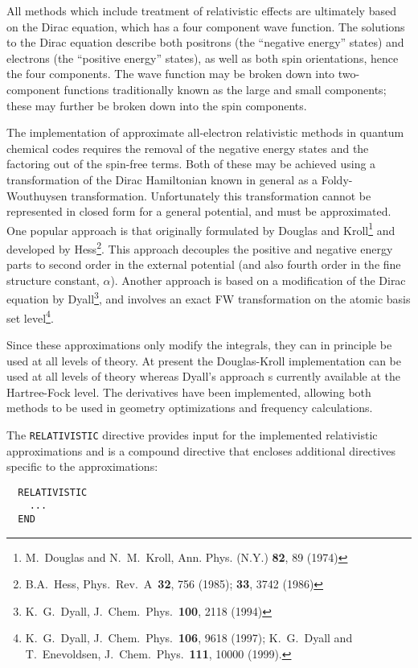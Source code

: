 \label{sec:rel}



All methods which include treatment of relativistic effects are ultimately
based on the Dirac equation, which has a four component wave function. The
solutions to the Dirac equation describe both positrons (the ``negative
energy'' states) and electrons (the ``positive energy'' states), as well as
both spin orientations, hence the four components. The wave function may be
broken down into two-component functions traditionally known as the large
and small components; these may further be broken down into the spin
components. 

The implementation of approximate all-electron relativistic methods in
quantum chemical codes requires the removal of the negative energy states
and the factoring out of the spin-free terms. Both of these may be achieved
using a transformation of the Dirac Hamiltonian known in general as a
Foldy-Wouthuysen transformation. Unfortunately this transformation cannot be
represented in closed form for a general potential, and must be
approximated.  One popular approach is that originally formulated by Douglas
and Kroll\footnote{M.~Douglas and N.~M.~Kroll, Ann. Phys. (N.Y.)  {\bf 82},
89 (1974)} and developed by Hess\footnote{B.A.~Hess, Phys.~Rev.~A~{\bf 32},
756 (1985); {\bf 33}, 3742 (1986)}. This approach decouples the positive and
negative energy parts to second order in the external potential (and also
fourth order in the fine structure constant, $\alpha$). Another approach is
based on a modification of the Dirac equation by Dyall\footnote{K.~G.~Dyall,
J.~Chem.~Phys.~{\bf 100}, 2118 (1994)}, and involves an exact FW
transformation on the atomic basis set level\footnote{K.~G.~Dyall,
J.~Chem.~Phys.~{\bf 106}, 9618 (1997); K.~G.~Dyall and T.~Enevoldsen,
J.~Chem.~Phys.~{\bf 111}, 10000 (1999).}.

Since these approximations only modify the integrals, they can in principle
be used at all levels of theory. At present the Douglas-Kroll implementation
can be used at all levels of theory whereas Dyall's approach s currently
available at the Hartree-Fock level. 
The derivatives have been implemented, allowing both methods to be used in 
geometry optimizations and frequency calculations.

The \verb+RELATIVISTIC+ directive provides input for the implemented relativistic 
approximations and is a compound directive that encloses additional directives 
specific to the approximations:

\begin{verbatim}
  RELATIVISTIC
    ...
  END
\end{verbatim}

